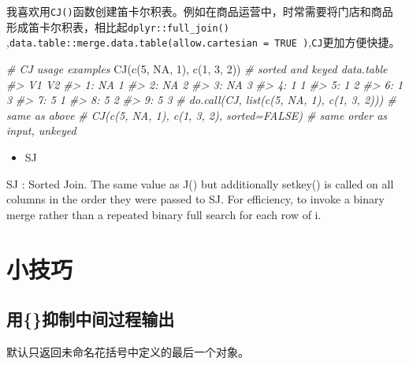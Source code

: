 \documentclass[
]{book}
\newenvironment{Shaded}{\begin{snugshade}}{\end{snugshade}}
\newcommand{\CommentTok}[1]{\textcolor[rgb]{0.56,0.35,0.01}{\textit{#1}}}
\newcommand{\ConstantTok}[1]{\textcolor[rgb]{0.00,0.00,0.00}{#1}}
\newcommand{\DecValTok}[1]{\textcolor[rgb]{0.00,0.00,0.81}{#1}}
\newcommand{\FunctionTok}[1]{\textcolor[rgb]{0.00,0.00,0.00}{#1}}
\newcommand{\NormalTok}[1]{#1}
\providecommand{\tightlist}{%
  \setlength{\itemsep}{0pt}\setlength{\parskip}{0pt}}
\begin{document}
我喜欢用\texttt{CJ()}函数创建笛卡尔积表。例如在商品运营中，时常需要将门店和商品形成笛卡尔积表，相比起\texttt{dplyr::full\_join()} ,\texttt{data.table::merge.data.table(allow.cartesian\ =\ TRUE\ )},\texttt{CJ}更加方便快捷。

\begin{Shaded}
\begin{Highlighting}[]
\CommentTok{\# CJ usage examples}
\FunctionTok{CJ}\NormalTok{(}\FunctionTok{c}\NormalTok{(}\DecValTok{5}\NormalTok{, }\ConstantTok{NA}\NormalTok{, }\DecValTok{1}\NormalTok{), }\FunctionTok{c}\NormalTok{(}\DecValTok{1}\NormalTok{, }\DecValTok{3}\NormalTok{, }\DecValTok{2}\NormalTok{))                 }\CommentTok{\# sorted and keyed data.table}
\CommentTok{\#\textgreater{}    V1 V2}
\CommentTok{\#\textgreater{} 1: NA  1}
\CommentTok{\#\textgreater{} 2: NA  2}
\CommentTok{\#\textgreater{} 3: NA  3}
\CommentTok{\#\textgreater{} 4:  1  1}
\CommentTok{\#\textgreater{} 5:  1  2}
\CommentTok{\#\textgreater{} 6:  1  3}
\CommentTok{\#\textgreater{} 7:  5  1}
\CommentTok{\#\textgreater{} 8:  5  2}
\CommentTok{\#\textgreater{} 9:  5  3}
\CommentTok{\# do.call(CJ, list(c(5, NA, 1), c(1, 3, 2)))  \# same as above}
\CommentTok{\# CJ(c(5, NA, 1), c(1, 3, 2), sorted=FALSE)   \# same order as input, unkeyed}
\end{Highlighting}
\end{Shaded}

\begin{itemize}
\tightlist
\item
  SJ
\end{itemize}

SJ : Sorted Join. The same value as J() but additionally setkey() is called on all columns in the order they were passed to SJ. For efficiency, to invoke a binary merge rather than a repeated binary full search for each row of i.

\hypertarget{ux5c0fux6280ux5de7}{%
\section{小技巧}\label{ux5c0fux6280ux5de7}}

\hypertarget{ux7528ux6291ux5236ux4e2dux95f4ux8fc7ux7a0bux8f93ux51fa}{%
\subsection{用\{\}抑制中间过程输出}\label{ux7528ux6291ux5236ux4e2dux95f4ux8fc7ux7a0bux8f93ux51fa}}

默认只返回未命名花括号中定义的最后一个对象。
\end{document}
